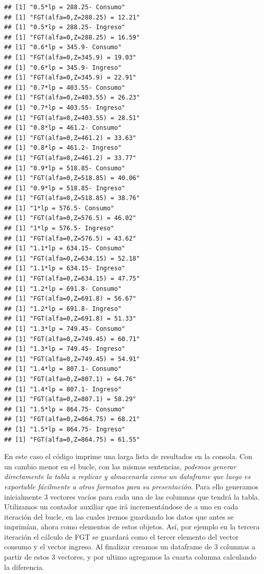 \documentclass[
]{book}
\begin{document}
\begin{verbatim}
## [1] "0.5*lp = 288.25- Consumo"
## [1] "FGT(alfa=0,Z=288.25) = 12.21"
## [1] "0.5*lp = 288.25- Ingreso"
## [1] "FGT(alfa=0,Z=288.25) = 16.59"
## [1] "0.6*lp = 345.9- Consumo"
## [1] "FGT(alfa=0,Z=345.9) = 19.03"
## [1] "0.6*lp = 345.9- Ingreso"
## [1] "FGT(alfa=0,Z=345.9) = 22.91"
## [1] "0.7*lp = 403.55- Consumo"
## [1] "FGT(alfa=0,Z=403.55) = 26.23"
## [1] "0.7*lp = 403.55- Ingreso"
## [1] "FGT(alfa=0,Z=403.55) = 28.51"
## [1] "0.8*lp = 461.2- Consumo"
## [1] "FGT(alfa=0,Z=461.2) = 33.63"
## [1] "0.8*lp = 461.2- Ingreso"
## [1] "FGT(alfa=0,Z=461.2) = 33.77"
## [1] "0.9*lp = 518.85- Consumo"
## [1] "FGT(alfa=0,Z=518.85) = 40.06"
## [1] "0.9*lp = 518.85- Ingreso"
## [1] "FGT(alfa=0,Z=518.85) = 38.76"
## [1] "1*lp = 576.5- Consumo"
## [1] "FGT(alfa=0,Z=576.5) = 46.02"
## [1] "1*lp = 576.5- Ingreso"
## [1] "FGT(alfa=0,Z=576.5) = 43.62"
## [1] "1.1*lp = 634.15- Consumo"
## [1] "FGT(alfa=0,Z=634.15) = 52.18"
## [1] "1.1*lp = 634.15- Ingreso"
## [1] "FGT(alfa=0,Z=634.15) = 47.75"
## [1] "1.2*lp = 691.8- Consumo"
## [1] "FGT(alfa=0,Z=691.8) = 56.67"
## [1] "1.2*lp = 691.8- Ingreso"
## [1] "FGT(alfa=0,Z=691.8) = 51.33"
## [1] "1.3*lp = 749.45- Consumo"
## [1] "FGT(alfa=0,Z=749.45) = 60.71"
## [1] "1.3*lp = 749.45- Ingreso"
## [1] "FGT(alfa=0,Z=749.45) = 54.91"
## [1] "1.4*lp = 807.1- Consumo"
## [1] "FGT(alfa=0,Z=807.1) = 64.76"
## [1] "1.4*lp = 807.1- Ingreso"
## [1] "FGT(alfa=0,Z=807.1) = 58.29"
## [1] "1.5*lp = 864.75- Consumo"
## [1] "FGT(alfa=0,Z=864.75) = 68.21"
## [1] "1.5*lp = 864.75- Ingreso"
## [1] "FGT(alfa=0,Z=864.75) = 61.55"
\end{verbatim}

En este caso el código imprime una larga lista de resultados en la consola. Con un cambio menor en el bucle, con las mismas sentencias, \emph{podemos generar directamente la tabla a replicar y almacenarla como un dataframe que luego es exportable fácilmente a otros formatos para su presentación}. Para ello generamos inicialmente 3 vectores vacíos para cada una de las columnas que tendrá la tabla. Utilizamos un contador auxiliar que irá incrementándose de a uno en cada iteración del bucle, en las cuales iremos guardando los datos que antes se imprimían, ahora como elementos de estos objetos. Así, por ejemplo en la tercera iteración el cálculo de FGT se guardará como el tercer elemento del vector consumo y el vector ingreso. Al finalizar creamos un dataframe de 3 columnas a partir de estos 3 vectores, y por ultimo agregamos la cuarta columna calculando la diferencia.
\end{document}
